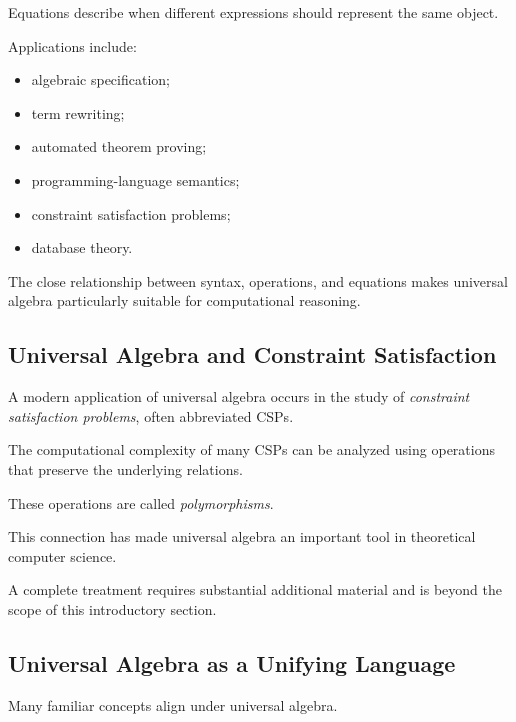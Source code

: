 Equations describe when different expressions should represent the same
object.

Applications include:

\begin{itemize}
    \item algebraic specification;
    \item term rewriting;
    \item automated theorem proving;
    \item programming-language semantics;
    \item constraint satisfaction problems;
    \item database theory.
\end{itemize}

The close relationship between syntax, operations, and equations makes
universal algebra particularly suitable for computational reasoning.

\subsection{Universal Algebra and Constraint Satisfaction}
\label{subsec:universal-algebra-csp}

A modern application of universal algebra occurs in the study of
\emph{constraint satisfaction problems}, often abbreviated CSPs.

The computational complexity of many CSPs can be analyzed using operations
that preserve the underlying relations.

These operations are called \emph{polymorphisms}.

This connection has made universal algebra an important tool in theoretical
computer science.

A complete treatment requires substantial additional material and is beyond
the scope of this introductory section.

\subsection{Universal Algebra as a Unifying Language}
\label{subsec:universal-algebra-unifying-language}

Many familiar concepts align under universal algebra.

